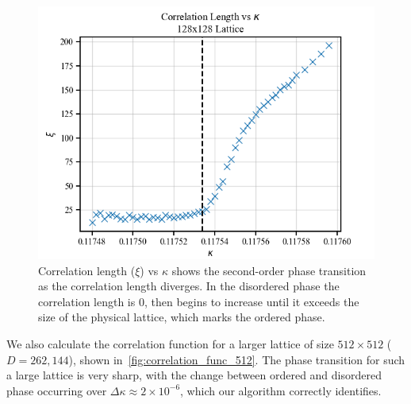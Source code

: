 \documentclass[11pt]{article}
\begin{document}
    \begin{figure}[h!]
        \center
        \includegraphics[width=\linewidth]{../figures/CorrelationLength}
        \caption{
            Correlation length ($\xi$) vs $\kappa$ shows the second-order phase transition as the correlation length
            diverges.
            In the disordered phase the correlation length is 0, then begins to increase until it
            exceeds the size of the physical lattice, which marks the ordered phase.
        }\label{fig:correlation_length}
    \end{figure}

    We also calculate the correlation function for a larger lattice of size $512 \times 512$ ($D=262,144$), shown
    in~\cref{fig:correlation_func_512}.
    The phase transition for such a large lattice is very sharp, with the change between ordered and disordered phase
    occurring over $\Delta \kappa \approx 2 \times 10^{-6}$, which our algorithm correctly identifies.
\end{document}
